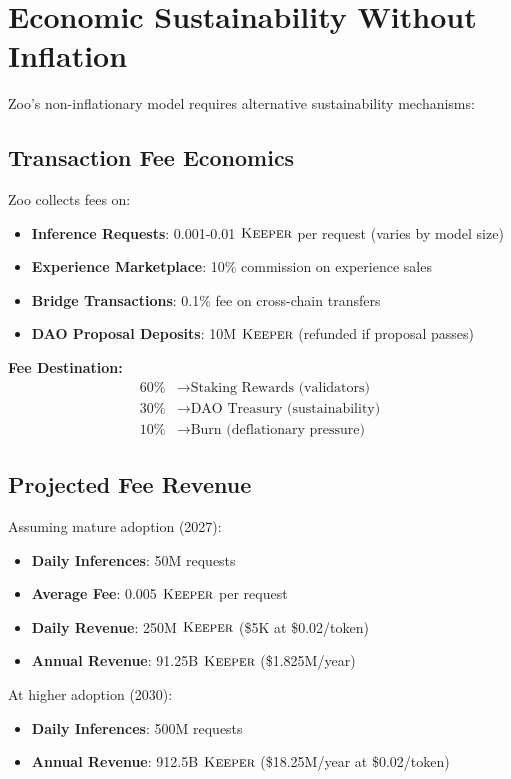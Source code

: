 \section{Economic Sustainability Without Inflation}


Zoo's non-inflationary model requires alternative sustainability mechanisms:

\subsection{Transaction Fee Economics}

Zoo collects fees on:
\begin{itemize}
\item \textbf{Inference Requests}: 0.001-0.01 $\textsc{Keeper}$ per request (varies by model size)
\item \textbf{Experience Marketplace}: 10\% commission on experience sales
\item \textbf{Bridge Transactions}: 0.1\% fee on cross-chain transfers
\item \textbf{DAO Proposal Deposits}: 10M $\textsc{Keeper}$ (refunded if proposal passes)
\end{itemize}

\textbf{Fee Destination:}
\begin{align}
60\% &\rightarrow \text{Staking Rewards (validators)} \\
30\% &\rightarrow \text{DAO Treasury (sustainability)} \\
10\% &\rightarrow \text{Burn (deflationary pressure)}
\end{align}

\subsection{Projected Fee Revenue}

Assuming mature adoption (2027):
\begin{itemize}
\item \textbf{Daily Inferences}: 50M requests
\item \textbf{Average Fee}: 0.005 $\textsc{Keeper}$ per request
\item \textbf{Daily Revenue}: 250M $\textsc{Keeper}$ (\$5K at \$0.02/token)
\item \textbf{Annual Revenue}: 91.25B $\textsc{Keeper}$ (\$1.825M/year)
\end{itemize}

At higher adoption (2030):
\begin{itemize}
\item \textbf{Daily Inferences}: 500M requests
\item \textbf{Annual Revenue}: 912.5B $\textsc{Keeper}$ (\$18.25M/year at \$0.02/token)
\end{itemize}

